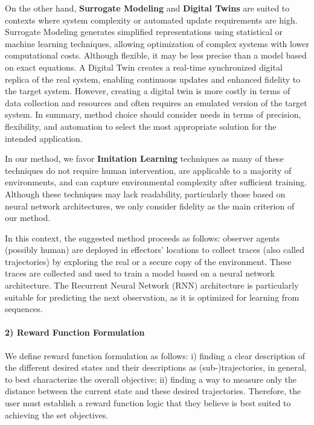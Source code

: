 \documentclass[sigconf,anonymous]{aamas}
\begin{document}
On the other hand, \textbf{Surrogate Modeling} and \textbf{Digital Twins} are suited to contexts where system complexity or automated update requirements are high. Surrogate Modeling generates simplified representations using statistical or machine learning techniques, allowing optimization of complex systems with lower computational costs. Although flexible, it may be less precise than a model based on exact equations. A Digital Twin creates a real-time synchronized digital replica of the real system, enabling continuous updates and enhanced fidelity to the target system. However, creating a digital twin is more costly in terms of data collection and resources and often requires an emulated version of the target system. In summary, method choice should consider needs in terms of precision, flexibility, and automation to select the most appropriate solution for the intended application.

In our method, we favor \textbf{Imitation Learning} techniques as many of these techniques do not require human intervention, are applicable to a majority of environments, and can capture environmental complexity after sufficient training. Although these techniques may lack readability, particularly those based on neural network architectures, we only consider fidelity as the main criterion of our method.

In this context, the suggested method proceeds as follows: observer agents (possibly human) are deployed in effectors' locations to collect traces (also called trajectories) by exploring the real or a secure copy of the environment. These traces are collected and used to train a model based on a neural network architecture. The Recurrent Neural Network (RNN) architecture is particularly suitable for predicting the next observation, as it is optimized for learning from sequences.

\paragraph{\textbf{2) Reward Function Formulation}} \quad

\noindent We define reward function formulation as follows: \quad i) finding a clear description of the different desired states and their descriptions as (sub-)trajectories, in general, to best characterize the overall objective; \quad ii) finding a way to measure only the distance between the current state and these desired trajectories. Therefore, the user must establish a reward function logic that they believe is best suited to achieving the set objectives.
\end{document}
